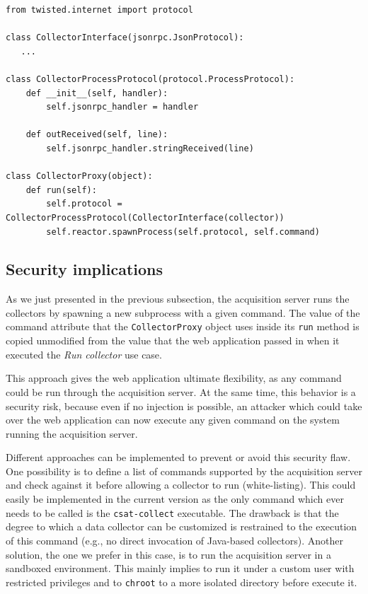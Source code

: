 \begin{lstlisting}[caption={Creation and publication of the collector interface.},label=lst:collector-interface]
from twisted.internet import protocol
  
class CollectorInterface(jsonrpc.JsonProtocol):
   ...

class CollectorProcessProtocol(protocol.ProcessProtocol):
    def __init__(self, handler):
        self.jsonrpc_handler = handler

    def outReceived(self, line):
        self.jsonrpc_handler.stringReceived(line)

class CollectorProxy(object):
    def run(self):
        self.protocol = CollectorProcessProtocol(CollectorInterface(collector))
        self.reactor.spawnProcess(self.protocol, self.command)
\end{lstlisting}


\subsection{Security implications}

As we just presented in the previous subsection, the acquisition server runs the collectors by spawning a new subprocess with a given command. The value of the command attribute that the \texttt{CollectorProxy} object uses inside its \texttt{run} method is copied unmodified from the value that the web application passed in when it executed the \emph{Run collector} use case.

This approach gives the web application ultimate flexibility, as any command could be run through the acquisition server. At the same time, this behavior is a security risk, because even if no injection is possible, an attacker which could take over the web application can now execute any given command on the system running the acquisition server.

Different approaches can be implemented to prevent or avoid this security flaw. One possibility is to define a list of commands supported by the acquisition server and check against it before allowing a collector to run (white-listing). This could easily be implemented in the current version as the only command which ever needs to be called is the \texttt{csat-collect} executable. The drawback is that the degree to which a data collector can be customized is restrained to the execution of this command (e.g., no direct invocation of Java-based collectors). Another solution, the one we prefer in this case, is to run the acquisition server in a sandboxed environment. This mainly implies to run it under a custom user with restricted privileges and to \texttt{chroot} to a more isolated directory before execute it.

